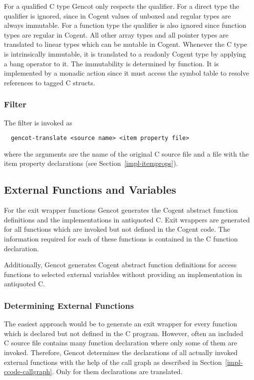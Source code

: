 For a qualified C type Gencot only respects the  qualifier. For a direct type the 
qualifier is ignored, since in Cogent values of unboxed and regular types are always immutable. For
a function type the qualifier is also ignored since function types are regular in Cogent. All other array types 
and all pointer types are translated to linear types which can be mutable in
Cogent. Whenever the C type is intrinsically immutable, it is translated to a readonly Cogent type by 
applying a bang operator to it. The immutability is determined by function. It is implemented
by a monadic action since it must access the symbol table to resolve references to tagged C structs.

\subsubsection{Filter }

The filter  is invoked as
\begin{verbatim}
  gencot-translate <source name> <item property file>
\end{verbatim}
where the arguments are the name of the original C source file and a file with the item property declarations (see 
Section~\ref{impl-itemprops}).

\subsection{External Functions and Variables}
\label{impl-ccomps-externs}

For the exit wrapper functions Gencot generates the Cogent abstract function definitions and the implementations
in antiquoted C. Exit wrappers are generated for all functions which are invoked but not defined in the Cogent code. 
The information required for each of these functions is contained in the C function declaration.

Additionally, Gencot generates Cogent abstract function definitions for access functions to selected external
variables without providing an implementation in antiquoted C.

\subsubsection{Determining External Functions}

The easiest approach would be to generate an exit wrapper for every function which is declared but 
not defined in the C program. However, often an
included C source file contains many function declaration where only some of them are invoked. Therefore, Gencot
determines the declarations of all actually invoked external functions with the help of the call graph as described in 
Section~\ref{impl-ccode-callgraph}. Only for them declarations are translated.

